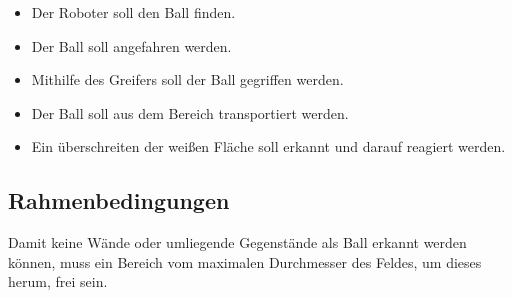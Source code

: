 \documentclass{fetch-my-doc}
\begin{document}
				\begin{itemize}
					\item Der Roboter soll den Ball finden.
					\item Der Ball soll angefahren werden.
					\item Mithilfe des Greifers soll der Ball gegriffen werden.
					\item Der Ball soll aus dem Bereich transportiert werden.
					\item Ein überschreiten der weißen Fläche soll erkannt und darauf reagiert werden.
				\end{itemize}
				
			\subsection{Rahmenbedingungen}
				
			Damit keine Wände oder umliegende Gegenstände als Ball erkannt werden können, muss ein Bereich vom maximalen Durchmesser des Feldes, um dieses herum, frei sein.
			
		
	
	
\end{document}

